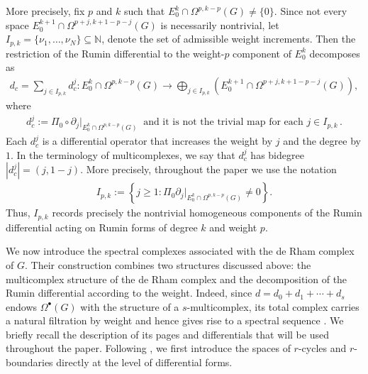 \documentclass[dvipsnames]{amsart}
\theoremstyle{definition}
\theoremstyle{definition}
\numberwithin{equation}{section}
\begin{document}
More precisely, fix $p$ and $k$ such that $E_0^k\cap\Omega^{p,k-p}(G)\neq\{0\}$.
Since not every space $E_0^{k+1}\cap\Omega^{p+j,k+1-p-j}(G)$ is necessarily nontrivial, let $I_{p,k}=\{\nu_1,\ldots,\nu_N\}\subseteq\mathbb N$, 
denote the set of admissible weight increments. Then the restriction of the Rumin differential to the weight-$p$ component of $E_0^k$ decomposes as
\begin{align}\label{eq: weight decomposition dc}
d_c
=
\sum_{j\in I_{p,k}}d_c^j
\colon
E_0^k\cap\Omega^{p,k-p}(G)
\longrightarrow
\bigoplus_{j\in I_{p,k}}
\left(
E_0^{k+1}\cap
\Omega^{p+j,k+1-p-j}(G)
\right),
\end{align}
where
\begin{align*}
d_c^j
:=
\Pi_0 \circ\partial_j\big|_{E_0^k\cap\Omega^{p,k-p}(G)}\ \text{ and it is not the trivial map for each }j\in I_{p,k}\,.
\end{align*}
Each $d_c^j$ is a differential operator that increases the weight by $j$ and the degree by $1$. In the terminology of multicomplexes, we say that $d_c^j$ has bidegree $|d_c^j|=(j,1-j)$.
More precisely, throughout the paper we use the notation \begin{align}\label{eq: definition Ipk} I_{p,k} := \left\{ j\geq 1: \Pi_0\partial_j \big|_{E_0^k\cap\Omega^{p,k-p}(G)} \neq 0 \right\}. \end{align} Thus, $I_{p,k}$ records precisely the nontrivial homogeneous components of the Rumin differential acting on Rumin forms of degree $k$ and weight $p$.



We now introduce the spectral complexes associated with the de Rham complex of $G$. Their construction combines two structures discussed above: the multicomplex structure of the de Rham complex and the decomposition of the Rumin differential according to the weight. Indeed, since $d =d_0 + d_1 + \cdots + d_s$ endows $\Omega^\bullet(G)$ with the structure of a $s$-multicomplex, its total complex carries a natural filtration by weight and hence gives rise to a spectral sequence \cite{livernet2020spectral,lerario2023multicomplexes}. We briefly recall the description of its pages and differentials that will be used throughout the paper. Following \cite{livernet2020spectral}, we first introduce the spaces of $r$-cycles and $r$-boundaries directly at the level of differential forms.
\end{document}
